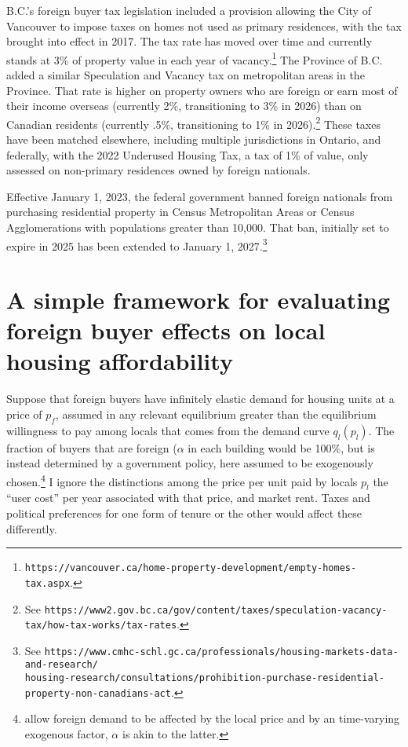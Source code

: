 \documentclass[12pt]{article}
\begin{document}
B.C.'s foreign buyer tax legislation included a provision allowing the City of
Vancouver to impose taxes on homes not used as primary residences, with the tax
brought into effect in 2017. The tax rate has moved over time and currently
stands at 3\% of property value in each year of vacancy.\footnote{\texttt{https://vancouver.ca/home-property-development/empty-homes-tax.aspx}.} The Province of B.C.
added a similar Speculation and Vacancy tax on metropolitan areas in the
Province. That rate is higher on property owners who are foreign or earn most
of their income overseas (currently 2\%, transitioning to 3\% in 2026) than on
Canadian residents (currently .5\%, transitioning to 1\% in 2026).\footnote{See
\texttt{https://www2.gov.bc.ca/gov/content/taxes/speculation-vacancy-tax/how-tax-works/tax-rates}.}
These taxes have been matched elsewhere, including multiple jurisdictions in
Ontario, and federally, with the 2022 Underused Housing Tax, a tax of 1\% of
value, only assessed on non-primary residences owned by foreign nationals.

Effective January 1, 2023, the federal government banned foreign nationals from
purchasing residential property in Census Metropolitan Areas or Census
Agglomerations with populations greater than 10,000. That ban, initially set to
expire in 2025 has been extended to January 1, 2027.\footnote{See
\texttt{https://www.cmhc-schl.gc.ca/professionals/housing-markets-data-and-research/\\housing-research/consultations/prohibition-purchase-residential-property-non-canadians-act}.}

\section{\label{sec:model} A simple framework for evaluating foreign buyer effects on local housing affordability}

Suppose that foreign buyers have infinitely elastic demand for housing units at
a price of $p_{f}$, assumed in any relevant equilibrium greater than the
equilibrium willingness to pay among locals that comes from the demand curve
$q_{l}\left(p_{l}\right)$. The fraction of buyers that are foreign ($\alpha$ in
each building would be 100\%, but is instead determined by a government policy,
here assumed to be exogenously
chosen.\footnote{\textcite{favilukisVanNieuwerburgh} allow foreign demand to be
affected by the local price and by an time-varying exogenous factor, $\alpha$
is akin to the latter.} I ignore the distinctions among the price per unit paid
by locals $p_{l}$ the ``user cost'' per year associated with that price, and
market rent. Taxes and political preferences for one form of tenure or the
other would affect these differently.
\end{document}
